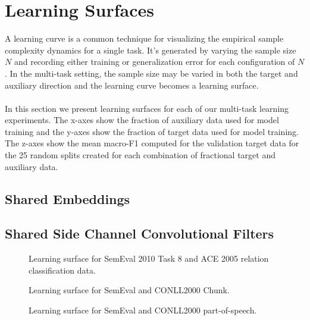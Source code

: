 \section{Learning Surfaces}
A learning curve is a common technique for visualizing the empirical sample complexity dynamics for a single task. It's generated by varying the sample size $N$ and recording either training or generalization error for each configuration of $N$. In the multi-task setting, the sample size may be varied in both the target and auxiliary direction and the learning curve becomes a learning surface.
\\\\
In this section we present learning surfaces for each of our multi-task learning experiments. The x-axes show the fraction of auxiliary data used for model training and the y-axes show the fraction of target data used for model training. The z-axes show the mean macro-F1 computed for the validation target data for the 25 random splits created for each combination of fractional target and auxiliary data.
\subsection{Shared Embeddings}
\subsection{Shared Side Channel Convolutional Filters}

\newpage
\pagestyle{empty}
\vspace*{2cm}
\begin{figure}[h!]
	\hspace*{-2cm}
	\caption{Learning surface for SemEval 2010 Task 8 and ACE 2005 relation classification data.}
\end{figure}
\begin{figure}[h!]
	\hspace*{-2cm}
	\caption{Learning surface for SemEval and CONLL2000 Chunk.}
\end{figure}
\begin{figure}[h!]
	\hspace*{-2cm}
	\caption{Learning surface for SemEval and CONLL2000 part-of-speech.}
\end{figure}
\newpage
\pagestyle{plain}
